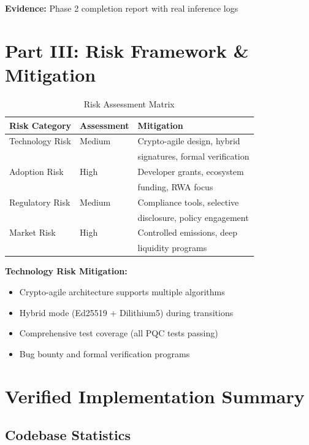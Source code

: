 \documentclass[11pt,a4paper]{article}
\begin{document}
\textbf{Evidence:} Phase 2 completion report with real inference logs

\section{Part III: Risk Framework \& Mitigation}

\begin{table}[h]
\centering
\begin{tabular}{@{}lll@{}}
\toprule
\textbf{Risk Category} & \textbf{Assessment} & \textbf{Mitigation} \\ \midrule
Technology Risk & Medium & Crypto-agile design, hybrid \\
 &  & signatures, formal verification \\
Adoption Risk & High & Developer grants, ecosystem \\
 &  & funding, RWA focus \\
Regulatory Risk & Medium & Compliance tools, selective \\
 &  & disclosure, policy engagement \\
Market Risk & High & Controlled emissions, deep \\
 &  & liquidity programs \\ \bottomrule
\end{tabular}
\caption{Risk Assessment Matrix}
\end{table}

\textbf{Technology Risk Mitigation:}
\begin{itemize}
    \item Crypto-agile architecture supports multiple algorithms
    \item Hybrid mode (Ed25519 + Dilithium5) during transitions
    \item Comprehensive test coverage (all PQC tests passing)
    \item Bug bounty and formal verification programs
\end{itemize}

\section{Verified Implementation Summary}

\subsection{Codebase Statistics}
\end{document}
